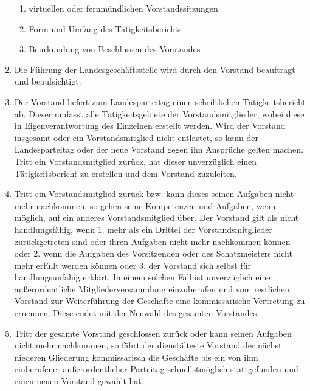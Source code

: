 \documentclass[draft,a4paper,10pt]{article}
\begin{document}
\begin{enumerate}
\begin{enumerate}
\item virtuellen oder fernmündlichen Vorstandssitzungen

\item Form und Umfang des Tätigkeitsberichts

\item Beurkundung von Beschlüssen des Vorstandes
\end{enumerate}

\item Die Führung der Landesgeschäftsstelle wird durch den Vorstand beauftragt
und beaufsichtigt.

\item Der Vorstand liefert zum Landesparteitag einen schriftlichen
Tätigkeitsbericht ab. Dieser umfasst alle Tätigkeitsgebiete der
Vorstandsmitglieder, wobei diese in Eigenverantwortung des Einzelnen erstellt
werden. Wird der Vorstand insgesamt oder ein Vorstandsmitglied nicht entlastet,
so kann der Landesparteitag oder der neue Vorstand gegen ihn Ansprüche gelten
machen. Tritt ein Vorstandsmitglied zurück, hat dieser unverzüglich einen
Tätigkeitsbericht zu erstellen und dem Vorstand zuzuleiten.

\item Tritt ein Vorstandsmitglied zurück bzw. kann dieses seinen Aufgaben nicht
mehr nachkommen, so gehen seine Kompetenzen und Aufgaben, wenn möglich, auf ein
anderes Vorstandsmitglied über.
Der Vorstand gilt als nicht handlungsfähig, wenn 1. mehr als ein Drittel der
Vorstandsmitglieder zurückgetreten sind oder ihren Aufgaben nicht mehr
nachkommen können oder 2. wenn die Aufgaben des Vorsitzenden oder des
Schatzmeisters nicht mehr erfüllt werden können oder 3. der Vorstand sich selbst
für handlungsunfähig erklärt.
In einem solchen Fall ist unverzüglich eine außerordentliche
Mitgliederversammlung einzuberufen und vom restlichen Vorstand zur Weiterführung
der Geschäfte eine kommissarische Vertretung zu ernennen. Diese endet mit der
Neuwahl des gesamten Vorstandes.

\item Tritt der gesamte Vorstand geschlossen zurück oder kann seinen Aufgaben
nicht mehr nachkommen, so fährt der dienstälteste Vorstand der nächst niederen
Gliederung kommissarisch die Geschäfte bis ein von ihm einberufener
außerordentlicher Parteitag schnellstmöglich stattgefunden und einen neuen
Vorstand gewählt hat.
\end{enumerate}
\end{document}
